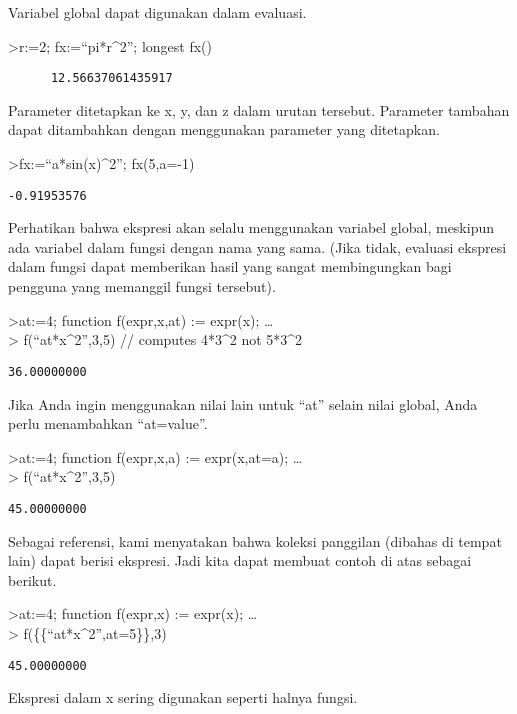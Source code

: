 \documentclass[
]{book}
\begin{document}
Variabel global dapat digunakan dalam evaluasi.

\textgreater r:=2; fx:=``pi*r\^{}2''; longest fx()

\begin{verbatim}
      12.56637061435917 
\end{verbatim}

Parameter ditetapkan ke x, y, dan z dalam urutan tersebut. Parameter tambahan dapat ditambahkan dengan menggunakan parameter yang ditetapkan.

\textgreater fx:=``a*sin(x)\^{}2''; fx(5,a=-1)

\begin{verbatim}
-0.91953576 
\end{verbatim}

Perhatikan bahwa ekspresi akan selalu menggunakan variabel global, meskipun ada variabel dalam fungsi dengan nama yang sama. (Jika tidak, evaluasi ekspresi dalam fungsi dapat memberikan hasil yang sangat membingungkan bagi pengguna yang memanggil fungsi tersebut).

\textgreater at:=4; function f(expr,x,at) := expr(x); \ldots{}\\
\textgreater{} f(``at*x\^{}2'',3,5) // computes 4*3\^{}2 not 5*3\^{}2

\begin{verbatim}
36.00000000 
\end{verbatim}

Jika Anda ingin menggunakan nilai lain untuk ``at'' selain nilai global, Anda perlu menambahkan ``at=value''.

\textgreater at:=4; function f(expr,x,a) := expr(x,at=a); \ldots{}\\
\textgreater{} f(``at*x\^{}2'',3,5)

\begin{verbatim}
45.00000000 
\end{verbatim}

Sebagai referensi, kami menyatakan bahwa koleksi panggilan (dibahas di tempat lain) dapat berisi ekspresi. Jadi kita dapat membuat contoh di atas sebagai berikut.

\textgreater at:=4; function f(expr,x) := expr(x); \ldots{}\\
\textgreater{} f(\{\{``at*x\^{}2'',at=5\}\},3)

\begin{verbatim}
45.00000000 
\end{verbatim}

Ekspresi dalam x sering digunakan seperti halnya fungsi.
\end{document}
